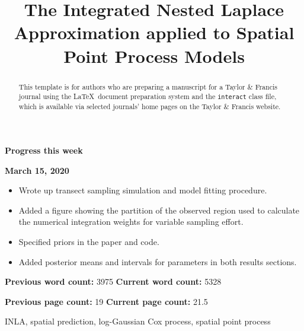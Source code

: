 \documentclass[]{interact}
\begin{document}
{\Large\bf Progress this week}

{\large\bf March 15, 2020}

\begin{itemize}

\item Wrote up transect sampling simulation and model fitting procedure.

\item Added a figure showing the partition of the observed region used to
calculate the numerical integration weights for variable sampling effort.

\item Specified priors in the paper and code.

\item Added posterior means and intervals for parameters in both results
sections.

\end{itemize}

\vfill

\textbf{Previous word count:} 3975 \hfill \textbf{Current word count:} 5328

\textbf{Previous page count:} 19 \hfill \textbf{Current page count:} 21.5

\pagebreak


\title{The Integrated Nested Laplace Approximation applied to Spatial Point Process Models}

\author{
}

\maketitle

\begin{abstract}
This template is for authors who are preparing a manuscript for a Taylor \& Francis journal using the \LaTeX\ document preparation system and the \texttt{interact} class file, which is available via selected journals' home pages on the Taylor \& Francis website.
\end{abstract}

\begin{keywords}
INLA, spatial prediction, log-Gaussian Cox process, spatial point process
\end{keywords}
\end{document}
